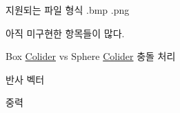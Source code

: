 
\begin{DoxyRefList}
\item[Member \mbox{\hyperlink{class_graphic_core_a2f09f46509760c465a6947f6770b179a}{Graphic\+Core::Load\+Texture}} (std\+::string)]\label{todo__todo000001}%
%
지원되는 파일 형식 .bmp .png  
\item[Class \mbox{\hyperlink{class_rigidbody}{Rigidbody}} ]\label{todo__todo000002}%
%
아직 미구현한 항목들이 많다.
\begin{DoxyItemize}
\item Box \mbox{\hyperlink{class_colider}{Colider}} vs Sphere \mbox{\hyperlink{class_colider}{Colider}} 충돌 처리
\item 반사 벡터
\item 중력 
\end{DoxyItemize}
\end{DoxyRefList}